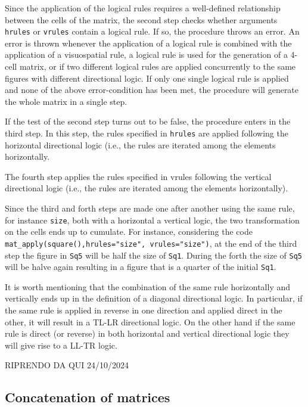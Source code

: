 Since the application of the logical rules requires a well-defined relationship between the cells of the matrix, the second step checks whether arguments \texttt{hrules} or \texttt{vrules} contain a logical rule.
If so, the procedure throws an error. An error is thrown whenever the application of a logical rule is combined with the application of a visuospatial rule, a logical rule is used for the generation of a 4-cell matrix, or if two different logical rules are applied concurrently to the same figures with different directional logic.
If only one single logical rule is applied and none of the above error-condition has been met, the procedure will generate the whole matrix in a single step.

If the test of the second step turns out to be false, the procedure enters in the third step.
In this step, the rules specified in \texttt{hrules} are applied following the horizontal directional logic (i.e., the rules are iterated among the elements horizontally.

The fourth step applies the rules specified in vrules following the vertical directional logic (i.e., the rules are iterated among the elements horizontally).

Since the third and forth steps are made one after another using the same rule, for instance \texttt{size}, both with a horizontal a vertical logic, the two transformation on the cells ends up to cumulate.
For instance, considering the code \texttt{mat\_apply(square(),hrules="size",\ vrules="size")}, at the end of the third step the figure in \texttt{Sq5} will be half the size of \texttt{Sq1}.
During the forth the size of \texttt{Sq5} will be halve again resulting in a figure that is a quarter of the initial \texttt{Sq1}.

It is worth mentioning that the combination of the same rule horizontally and vertically ends up in the definition of a diagonal directional logic.
In particular, if the same rule is applied in reverse in one direction and applied direct in the other, it will result in a TL-LR directional logic.
On the other hand if the same rule is direct (or reverse) in both horizontal and vertical directional logic they
will give rise to a LL-TR logic.

RIPRENDO DA QUI 24/10/2024

\subsection{Concatenation of matrices}\label{concatenation-of-matrices}

